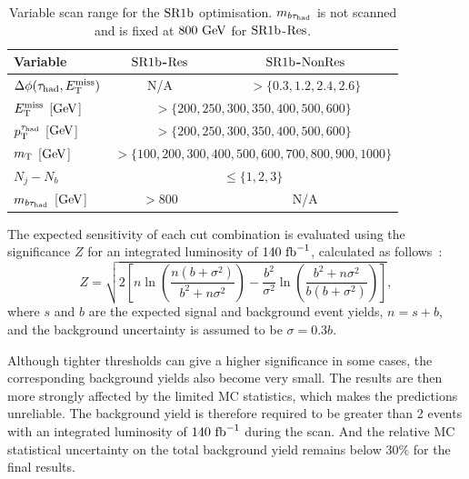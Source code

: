 \begin{table}[htbp]
    \centering
    \small
    \caption[Variable scan ranges for the $\bTagSR$ optimisation]{Variable scan range for the $\bTagSR$ optimisation. $m_{b\tau_{\mathrm{had}}}$ is not scanned and is fixed at $800~\mathrm{GeV}$ for $\bTagSR$-$\mathrm{Res}$.}
    \label{tab:ch7_scan_variables}
    \begin{tabular}{lcc}
        \toprule
        Variable & $\bTagSR$-$\mathrm{Res}$ & $\bTagSR$-$\mathrm{NonRes}$ \\
        \midrule
        $\Delta\phi(\tau_{\mathrm{had}}, E_{\mathrm{T}}^{\mathrm{miss}})$ & N/A & $>\{0.3,1.2,2.4,2.6\}$ \\
        $E_{\mathrm{T}}^{\mathrm{miss}}$ [$\mathrm{GeV}$] & \multicolumn{2}{c}{$>\{200,250,300,350,400,500,600\}$} \\
        $p_{\mathrm{T}}^{\tau_{\mathrm{had}}}$ [$\mathrm{GeV}$] & \multicolumn{2}{c}{$>\{200,250,300,350,400,500,600\}$} \\
        $m_{\mathrm{T}}$ [$\mathrm{GeV}$] & \multicolumn{2}{c}{$>\{100,200,300,400,500,600,700,800,900,1000\}$} \\
        $N_j-N_b$ & \multicolumn{2}{c}{$\leq\{1,2,3\}$} \\
        \midrule
        $m_{b\tau_{\mathrm{had}}}$ [$\mathrm{GeV}$] & $>800$ & N/A \\
        \bottomrule
    \end{tabular}
\end{table}


The expected sensitivity of each cut combination is evaluated using the significance $Z$ for an integrated luminosity of $140~\mathrm{fb}^{-1}$, calculated as follows~\cite{Basso2022Significance}:
\begin{equation}
    Z = \sqrt{2\left[n\ln\!\left(\frac{n(b+\sigma^2)}{b^2+n\sigma^2}\right)-\frac{b^2}{\sigma^2}\ln\!\left(\frac{b^2+n\sigma^2}{b(b+\sigma^2)}\right)\right]},
    \label{eq:ch7_optimisation_significance}
\end{equation}
where $s$ and $b$ are the expected signal and background event yields, $n=s+b$, and the background uncertainty is assumed to be $\sigma=0.3b$.

Although tighter thresholds can give a higher significance in some cases, the corresponding background yields also become very small.
The results are then more strongly affected by the limited MC statistics, which makes the predictions unreliable.
The background yield is therefore required to be greater than 2 events with an integrated luminosity of $140~\mathrm{fb}^{-1}$ during the scan. And the relative MC statistical uncertainty on the total background yield remains below $30\%$ for the final results.

